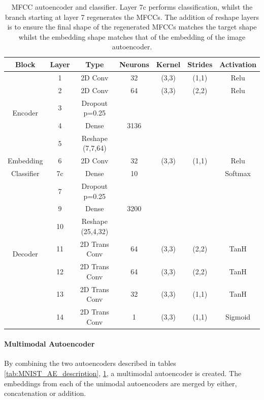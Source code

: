 	\begin{table}[t]
		\centering
		\begin{tabular}{|c|c|c|c|c|c|c|}
			\hline
			Block & Layer & Type & Neurons & Kernel & Strides & Activation  \\ \hline
			\multirow{5}{*}{Encoder} & 1	&	2D Conv & 32 & (3,3) & (1,1)  & Relu\\ \cline{2-7}
			& 2	&	2D Conv & 64 & (3,3) & (2,2)  & Relu\\ \cline{2-7}
			& 3 	&	Dropout p=0.25 &	 & 	     &        & \\ \cline{2-7}
			& 4	&	Dense          & 3136 & 	 &        & \\ \cline{2-7}
			& 5   &	Reshape (7,7,64) &    &     &        & \\ \hline
			Embedding & 6	&	2D Conv & 32 & (3,3) & (1,1)  & Relu  \\ \hline
			Classifier & 7c	&	Dense          & 10 &       &        & Softmax \\ \hline
			\multirow{7}{*}{Decoder} & 7 	&	Dropout p=0.25 &	 & 	     &        & \\ \cline{2-7}
			& 9	&	Dense			& 3200 &     &        & \\ \cline{2-7}
			& 10	&	Reshape (25,4,32) &    &    &        & \\ \cline{2-7}
			& 11	&	2D Trans Conv & 64 & (3,3) & (2,2)  & TanH \\ \cline{2-7}
			& 12	&	2D Trans Conv & 64 & (3,3) & (2,2)  & TanH \\ \cline{2-7}
			& 13	&	2D Trans Conv & 32 & (3,3) & (1,1)  & TanH \\ \cline{2-7}
			& 14	&	2D Trans Conv & 1 & (3,3) & (1,1) & Sigmoid \\ \hline
		\end{tabular}
		\caption{MFCC autoencoder and classifier. Layer 7c performs classification, whilst the branch starting at layer 7 regenerates the MFCCs. The addition of reshape layers is to ensure the final shape of the regenerated MFCCs matches the target shape whilst the embedding shape matches that of the embedding of the image autoencoder.}
		\label{tab:UCU_AE_description}
	\end{table}

\paragraph{Multimodal Autoencoder}
By combining the two autoencoders described in tables \ref{tab:MNIST_AE_description}, \ref{tab:UCU_AE_description}, a multimodal autoencoder is created. The embeddings from each of the unimodal autoencoders are merged by either, concatenation or addition.
 
